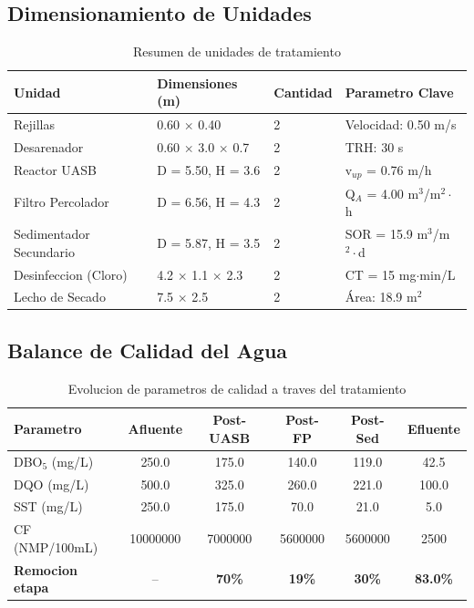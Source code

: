 \documentclass[12pt,a4paper]{article}
\begin{document}
\subsection{Dimensionamiento de Unidades}

\begin{table}[H]
\centering
\caption{Resumen de unidades de tratamiento}
\small
\begin{tabular}{p{3.2cm}p{3.5cm}p{1.5cm}p{4.8cm}}
\toprule
\textbf{Unidad} & \textbf{Dimensiones (m)} & \textbf{Cantidad} & \textbf{Parametro Clave} \\
\midrule
Rejillas & 0.60 $\times$ 0.40 & 2 & Velocidad: 0.50 m/s \\
Desarenador & 0.60 $\times$ 3.0 $\times$ 0.7 & 2 & TRH: 30 s \\
Reactor UASB & D = 5.50, H = 3.6 & 2 & v$_{up}$ = 0.76 m/h \\
Filtro Percolador & D = 6.56, H = 4.3 & 2 & Q$_A$ = 4.00 m$^3$/m$^2\cdot$h \\
Sedimentador Secundario & D = 5.87, H = 3.5 & 2 & SOR = 15.9 m$^3$/m$^2\cdot$d \\
Desinfeccion (Cloro) & 4.2 $\times$ 1.1 $\times$ 2.3 & 2 & CT = 15 mg$\cdot$min/L \\
Lecho de Secado & 7.5 $\times$ 2.5 & 2 & Área: 18.9 m$^2$ \\
\bottomrule
\end{tabular}
\end{table}

\subsection{Balance de Calidad del Agua}

\begin{table}[H]
\centering
\caption{Evolucion de parametros de calidad a traves del tratamiento}
\begin{tabular}{lccccc}
\toprule
\textbf{Parametro} & \textbf{Afluente} & \textbf{Post-UASB} & \textbf{Post-FP} & \textbf{Post-Sed} & \textbf{Efluente} \\
\midrule
DBO$_5$ (mg/L) & 250.0 & 175.0 & 140.0 & 119.0 & 42.5 \\
DQO (mg/L) & 500.0 & 325.0 & 260.0 & 221.0 & 100.0 \\
SST (mg/L) & 250.0 & 175.0 & 70.0 & 21.0 & 5.0 \\
CF (NMP/100mL) & 10000000 & 7000000 & 5600000 & 5600000 & 2500 \\
\midrule
\textbf{Remocion etapa} & -- & \textbf{70\%} & \textbf{19\%} & \textbf{30\%} & \textbf{83.0\%} \\
\bottomrule
\end{tabular}
\end{table}
\end{document}
